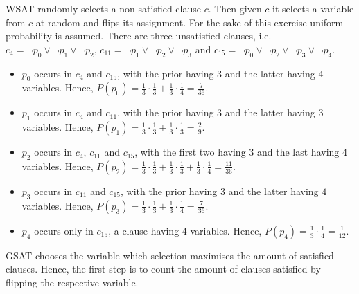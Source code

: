 \documentclass[11pt,a4paper]{article}
\begin{document}
WSAT randomly selects a non satisfied clause $c$. Then given $c$ it selects a variable from $c$ at random and flips its assignment. For the sake of this exercise uniform probability is assumed. There are three unsatisfied clauses, i.e. $c_4=\neg p_0 \lor \neg p_1 \lor \neg p_2$, $c_{11}=\neg p_1 \lor \neg p_2 \lor \neg p_3$ and $c_{15}=\neg p_0 \lor \neg p_2 \lor \neg p_3 \lor \neg p_4$. 
\begin{itemize}
\item $p_0$ occurs in $c_4$ and $c_{15}$, with the prior having $3$ and the latter having $4$ variables. Hence, $P(p_0)=\frac{1}{3}\cdot \frac{1}{3} +\frac{1}{3}\cdot \frac{1}{4}= \frac{7}{36}$.  
\item $p_1$ occurs in $c_4$ and $c_{11}$, with the prior having $3$ and the latter having $3$ variables. Hence, $P(p_1)=\frac{1}{3}\cdot \frac{1}{3} +\frac{1}{3}\cdot \frac{1}{3}= \frac{2}{9}$.  
\item $p_2$ occurs in $c_4$, $c_{11}$ and $c_{15}$, with the first two having $3$ and the last having $4$ variables. Hence, $P(p_2)=\frac{1}{3}\cdot \frac{1}{3} +\frac{1}{3}\cdot \frac{1}{3} +\frac{1}{3}\cdot \frac{1}{4}= \frac{11}{36}$.  
\item $p_3$ occurs in $c_{11}$ and $c_{15}$, with the prior having $3$ and the latter having $4$ variables. Hence, $P(p_3)=\frac{1}{3}\cdot \frac{1}{3} +\frac{1}{3}\cdot \frac{1}{4}= \frac{7}{36}$.  
\item $p_4$ occurs only in $c_{15}$, a clause having $4$ variables. Hence, $P(p_4)=\frac{1}{3}\cdot \frac{1}{4}= \frac{1}{12}$.  
\end{itemize}

%

GSAT chooses the variable which selection maximises the amount of satisfied clauses. Hence, the first step is to count the amount of clauses satisfied by flipping the respective variable.
\end{document}
